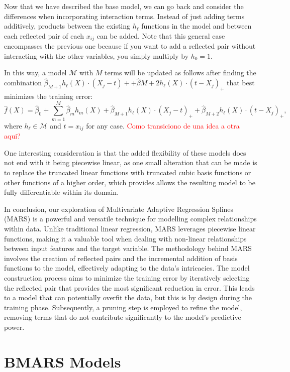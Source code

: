 Now that we have described the base model, we can go back and consider the differences when incorporating interaction terms. Instead of just adding terms additively, products between the existing $h_\ell$ functions in the model and between each reflected pair of each $x_{ij}$ can be added. Note that this general case encompasses the previous one because if you want to add a reflected pair without interacting with the other variables, you simply multiply by $h_0 = 1$.

In this way, a model $\mathcal{M}$ with $M$ terms will be updated as follows after finding the combination $\hat \beta_{M+1} h_\ell(X) \cdot (X_j - t)+ + \hat \beta{M+2} h_\ell(X) \cdot (t-X_j)_+$ that best minimizes the training error:
$$
\hat f(X) = \hat \beta_0 + \sum_{m=1}^M \hat \beta_m h_m(X) + \hat \beta_{M+1} h_\ell(X) \cdot (X_j - t)_+ + \hat \beta_{M+2} h_\ell(X) \cdot (t-X_j)_+,
$$
where $h_\ell \in \mathcal{M}$ and $t = x_{ij}$ for any case. \textcolor{red}{Como transiciono de una idea a otra aqui?}

One interesting consideration is that the added flexibility of these models does not end with it being piecewise linear, as one small alteration that can be made is to replace the truncated linear functions with truncated cubic basis functions or other functions of a higher order, which provides allows the resulting model to be fully differentiable within its domain. 

In conclusion, our exploration of Multivariate Adaptive Regression Splines (MARS) is a powerful and versatile technique for modelling complex relationships within data. Unlike traditional linear regression, MARS leverages piecewise linear functions, making it a valuable tool when dealing with non-linear relationships between input features and the target variable. The methodology behind MARS involves the creation of reflected pairs and the incremental addition of basis functions to the model, effectively adapting to the data's intricacies. The model construction process aims to minimize the training error by iteratively selecting the reflected pair that provides the most significant reduction in error. This leads to a model that can potentially overfit the data, but this is by design during the training phase. Subsequently, a pruning step is employed to refine the model, removing terms that do not contribute significantly to the model's predictive power.

\section{BMARS Models}

